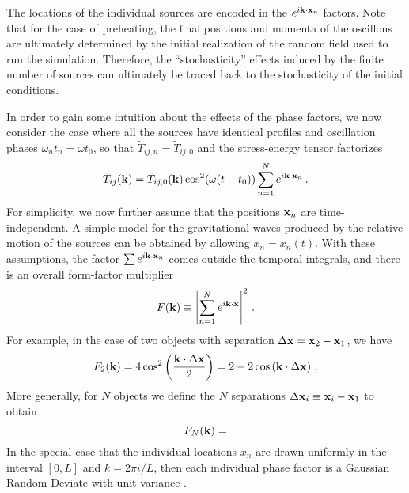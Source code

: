 \documentclass{revtex4}
\begin{document}
The locations of the individual sources are encoded in the $e^{i{\bf k}\cdot{\bf x}_n}$ factors.
Note that for the case of preheating, the final positions and momenta of the oscillons are ultimately determined by the initial realization of the random field used to run the simulation.
Therefore, the ``stochasticity'' effects induced by the finite number of sources can ultimately be traced back to the stochasticity of the initial conditions.

In order to gain some intuition about the effects of the phase factors,
we now consider the case where all the sources have identical profiles and oscillation phases $\omega_nt_n = \omega t_0$, so that $\tilde{T}_{ij,n} = \tilde{T}_{ij,0}$ and the stress-energy tensor factorizes
\begin{equation}
  \tilde{T}_{ij}({\bf k}) = \tilde{T}_{ij,0}({\bf k})\cos^2(\omega (t-t_0)) \sum_{n=1}^N e^{i{\bf k}\cdot{\bf x}_n} \, .
\end{equation}
For simplicity, we now further assume that the positions ${\bf x}_n$ are time-independent.
A simple model for the gravitational waves produced by the relative motion of the sources can be obtained by allowing $x_n = x_n(t)$.
With these assumptions, the factor $\sum e^{i{\bf k}\cdot{\bf x}_n}$ comes outside the temporal integrals, and there is an overall form-factor multiplier
\begin{equation}
  F({\bf k}) \equiv \left|\sum_{n=1}^N e^{i{\bf k}\cdot{\bf x}}\right|^2 \, .
\end{equation}
For example, in the case of two objects with separation $\Delta{\bf x} = {\bf x}_2-{\bf x}_1$, we have
\begin{equation}
  F_2({\bf k}) = 4\cos^2\left(\frac{{\bf k}\cdot\Delta{\bf x}}{2}\right) = 2 - 2\cos\left({\bf k}\cdot\Delta{\bf x}\right) \, .
\end{equation}
More generally, for $N$ objects we define the $N$ separations $\Delta{\bf x}_i \equiv {\bf x}_i-{\bf x}_1$ to obtain
\begin{equation}
  F_N({\bf k}) = 
\end{equation}
In the special case that the individual locations $x_n$ are drawn uniformly in the interval $[0,L]$ and $k = 2\pi i / L$, then each individual phase factor is a Gaussian Random Deviate with unit variance .
\end{document}
